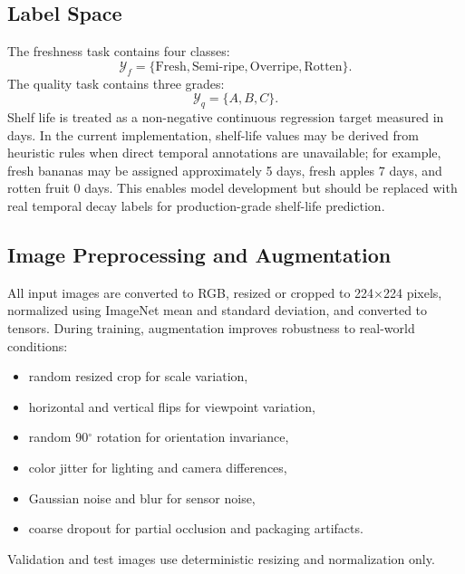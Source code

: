 \documentclass[conference]{IEEEtran}
\begin{document}
\subsection{Label Space}
The freshness task contains four classes:
\begin{equation}
\mathcal{Y}_{f}=\{\text{Fresh},\text{Semi-ripe},\text{Overripe},\text{Rotten}\}.
\end{equation}
The quality task contains three grades:
\begin{equation}
\mathcal{Y}_{q}=\{A,B,C\}.
\end{equation}
Shelf life is treated as a non-negative continuous regression target measured in days. In the current implementation, shelf-life values may be derived from heuristic rules when direct temporal annotations are unavailable; for example, fresh bananas may be assigned approximately 5 days, fresh apples 7 days, and rotten fruit 0 days. This enables model development but should be replaced with real temporal decay labels for production-grade shelf-life prediction.

\subsection{Image Preprocessing and Augmentation}
All input images are converted to RGB, resized or cropped to 224$\times$224 pixels, normalized using ImageNet mean and standard deviation, and converted to tensors. During training, augmentation improves robustness to real-world conditions:
\begin{itemize}
    \item random resized crop for scale variation,
    \item horizontal and vertical flips for viewpoint variation,
    \item random 90$^{\circ}$ rotation for orientation invariance,
    \item color jitter for lighting and camera differences,
    \item Gaussian noise and blur for sensor noise,
    \item coarse dropout for partial occlusion and packaging artifacts.
\end{itemize}
Validation and test images use deterministic resizing and normalization only.
\end{document}
